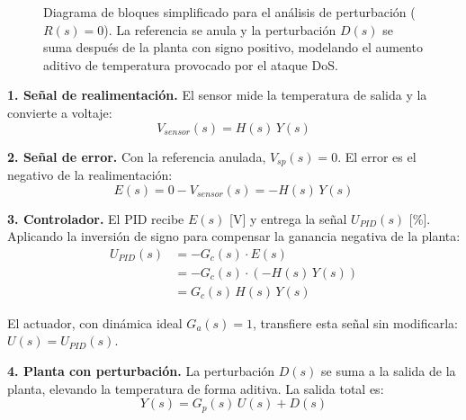 \documentclass[journal,twocolumn]{IEEEtran}
\begin{document}
\begin{figure}[htbp]
{%
    }
    \shorthandon{<}
    \shorthandon{>}
    \caption{Diagrama de bloques simplificado para el análisis de perturbación ($R(s)=0$). La referencia se anula y la perturbación $D(s)$ se suma después de la planta con signo positivo, modelando el aumento aditivo de temperatura provocado por el ataque DoS.}
    \label{fig:bloques_perturbacion}
\end{figure}

\textbf{1. Señal de realimentación.} El sensor mide la temperatura de salida y la convierte a voltaje:
\begin{equation}
    V_{sensor}(s) = H(s)\,Y(s)
\end{equation}

\textbf{2. Señal de error.} Con la referencia anulada, $V_{sp}(s) = 0$. El error es el negativo de la realimentación:
\begin{equation}
    E(s) = 0 - V_{sensor}(s) = -H(s)\,Y(s)
\end{equation}

\textbf{3. Controlador.} El PID recibe $E(s)$ [V] y entrega la señal $U_{PID}(s)$ [\%]. Aplicando la inversión de signo para compensar la ganancia negativa de la planta:
\begin{align}
    U_{PID}(s) &= -G_c(s) \cdot E(s) \nonumber \\
               &= -G_c(s) \cdot (-H(s)\,Y(s)) \nonumber \\
               &= G_c(s)\,H(s)\,Y(s)
\end{align}

El actuador, con dinámica ideal $G_a(s) = 1$, transfiere esta señal sin modificarla: $U(s) = U_{PID}(s)$.

\textbf{4. Planta con perturbación.} La perturbación $D(s)$ se suma a la salida de la planta, elevando la temperatura de forma aditiva. La salida total es:
\begin{equation}
    Y(s) = G_p(s)\,U(s) + D(s)
\end{equation}
\end{document}
